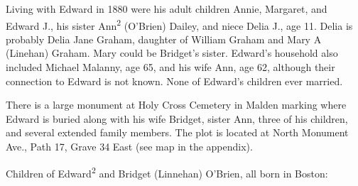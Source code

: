 Living with Edward in 1880 were his adult children Annie, Margaret, and Edward J., his sister Ann\textsuperscript{2} (O'Brien) Dailey, and niece Delia J., age 11.\cite{Census1880Edward} Delia is probably Delia Jane Graham, daughter of William Graham and Mary A (Linehan) Graham.\cite{DeliaGrahamBirth,MaryGrahamDeath} Mary could be Bridget's sister. Edward's household also included Michael Malanny, age 65, and his wife Ann, age 62, although their connection to Edward is not known.\cite{Census1880Edward} None of Edward's children ever married. 

There is a large monument at Holy Cross Cemetery in Malden marking where Edward is buried along with his wife Bridget, sister Ann, three of his children, and several extended family members. The plot is located at North Monument Ave., Path 17, Grave 34 East (see map in the appendix).\cite{Edward2OBrienGrave,CarolGordon}

\begin{KidsIntro}
	Children of Edward\textsuperscript{2} and Bridget (Linnehan) O'Brien, all born in Boston:
\end{KidsIntro}

